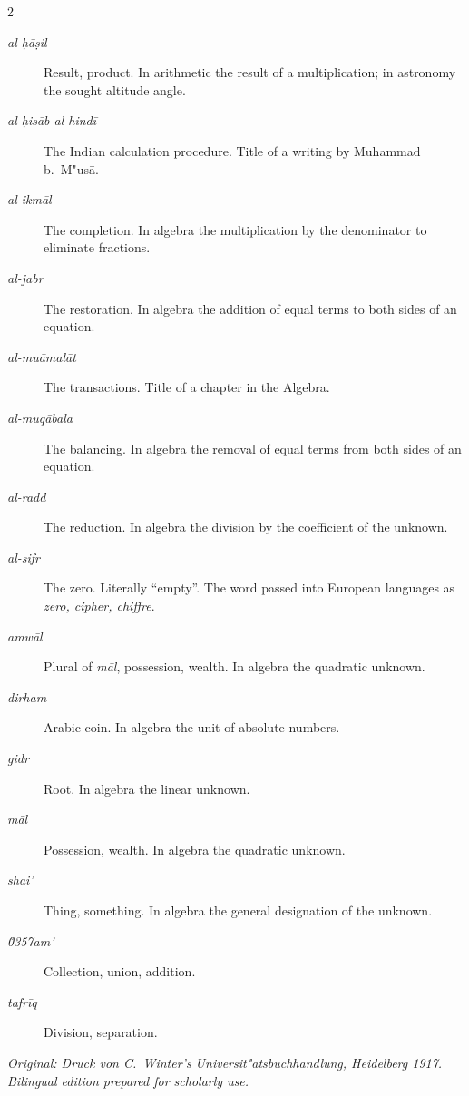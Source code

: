 \documentclass[10pt,a4paper]{article}
\newcommand{\enquote}[1]{``#1''}
\begin{document}
\begin{paracol}{2}
\switchcolumn

\begin{description}
\item[\textit{al-\d{h}\=a\d{s}il}] Result, product. In arithmetic the result of a multiplication; in astronomy the sought altitude angle.
\item[\textit{al-\d{h}is\=ab al-hind\=i}] The Indian calculation procedure. Title of a writing by Muhammad b.\ M"us\=a.
\item[\textit{al-ikm\=al}] The completion. In algebra the multiplication by the denominator to eliminate fractions.
\item[\textit{al-jabr}] The restoration. In algebra the addition of equal terms to both sides of an equation.
\item[\textit{al-mu\=amal\=at}] The transactions. Title of a chapter in the Algebra.
\item[\textit{al-muq\=abala}] The balancing. In algebra the removal of equal terms from both sides of an equation.
\item[\textit{al-radd}] The reduction. In algebra the division by the coefficient of the unknown.
\item[\textit{al-sifr}] The zero. Literally \enquote{empty}. The word passed into European languages as \textit{zero, cipher, chiffre}.
\item[\textit{amw\=al}] Plural of \textit{m\=al}, possession, wealth. In algebra the quadratic unknown.
\item[\textit{dirham}] Arabic coin. In algebra the unit of absolute numbers.
\item[\textit{gidr}] Root. In algebra the linear unknown.
\item[\textit{m\=al}] Possession, wealth. In algebra the quadratic unknown.
\item[\textit{shai'}] Thing, something. In algebra the general designation of the unknown.
\item[\textit{\u0357{}am'}] Collection, union, addition.
\item[\textit{tafr\={i}q}] Division, separation.
\end{description}

\end{paracol}

\vspace{1cm}
\begin{center}
\textit{Original: Druck von C.\ Winter's Universit"atsbuchhandlung, Heidelberg 1917.}\\
\textit{Bilingual edition prepared for scholarly use.}
\end{center}
\end{document}
